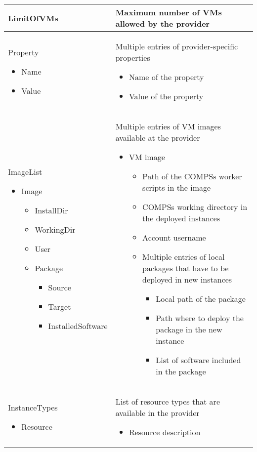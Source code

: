 \begin{longtable}{| p{} | p{} |}
\hline
LimitOfVMs	&	Maximum number of VMs allowed by the provider	\\
\hline
Property
\begin{itemize}
 \item Name
 \item Value
\end{itemize}
&
Multiple entries of provider-specific properties
\begin{itemize}
 \item Name of the property
 \item Value of the property
\end{itemize}
\\
\hline
ImageList
\begin{itemize}
 \item Image
 \begin{itemize}
  \item InstallDir
  \item WorkingDir
  \item User
  \item Package
  \begin{itemize}
   \item Source
   \item Target
   \item InstalledSoftware
  \end{itemize}
 \end{itemize}
\end{itemize}
& 
Multiple entries of VM images available at the provider
\begin{itemize}
 \item VM image
  \begin{itemize}
   \item Path of the COMPSs worker scripts in the image
   \item COMPSs working directory in the deployed instances
   \item Account username
   \item Multiple entries of local packages that have to be deployed in new instances
   \begin{itemize}
    \item Local path of the package
    \item Path where to deploy the package in the new instance
    \item List of software included in the package
  \end{itemize}
 \end{itemize}
\end{itemize}
\\
\hline
InstanceTypes
\begin{itemize}
 \item Resource
\end{itemize}
& 
List of resource types that are available in the provider
\begin{itemize}
 \item Resource description
\end{itemize}


\end{longtable}
